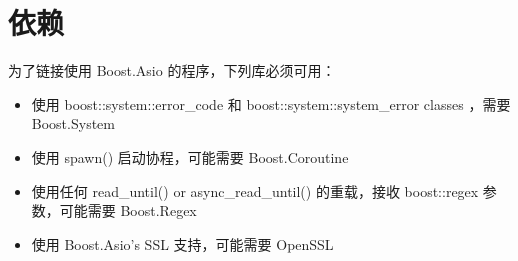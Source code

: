 \section{依赖}
为了链接使用 Boost.Asio 的程序，下列库必须可用：
\begin{itemize}
	\item 使用 boost::system::error\_code 和 boost::system::system\_error classes ，需要 Boost.System
	\item 使用 spawn() 启动协程，可能需要 Boost.Coroutine
	\item 使用任何 read\_until() or async\_read\_until() 的重载，接收 boost::regex 参数，可能需要 Boost.Regex 
	\item 使用  Boost.Asio's SSL 支持，可能需要 OpenSSL
\end{itemize}

	